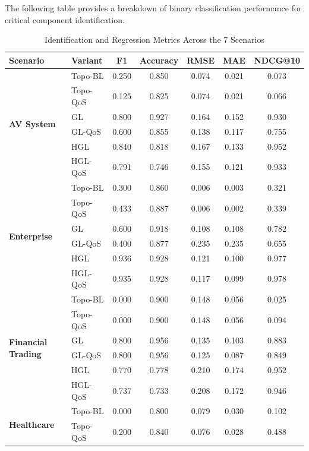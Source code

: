 \documentclass[sigconf,9pt,anonymous]{acmart}
\begin{document}
The following table provides a breakdown of binary classification performance for critical component identification.

\begin{table}[t]
\centering
\caption{Identification and Regression Metrics Across the 7 Scenarios}
\label{tab:ident_perf}
\begin{tabular}{l l c c c c c}
\toprule
\textbf{Scenario} & \textbf{Variant} & \textbf{F1} & \textbf{Accuracy} & \textbf{RMSE} & \textbf{MAE} & \textbf{NDCG@10} \\
\midrule
\multirow{6}{*}{\textbf{AV System}} 
  & Topo-BL & 0.250 & 0.850 & 0.074 & 0.021 & 0.073 \\
  & Topo-QoS & 0.125 & 0.825 & 0.074 & 0.021 & 0.066 \\
  & GL & 0.800 & 0.927 & 0.164 & 0.152 & 0.930 \\
  & GL-QoS & 0.600 & 0.855 & 0.138 & 0.117 & 0.755 \\
  & HGL & 0.840 & 0.818 & 0.167 & 0.133 & 0.952 \\
  & HGL-QoS & 0.791 & 0.746 & 0.155 & 0.121 & 0.933 \\
\midrule
\multirow{6}{*}{\textbf{Enterprise}} 
  & Topo-BL & 0.300 & 0.860 & 0.006 & 0.003 & 0.321 \\
  & Topo-QoS & 0.433 & 0.887 & 0.006 & 0.002 & 0.339 \\
  & GL & 0.600 & 0.918 & 0.108 & 0.108 & 0.782 \\
  & GL-QoS & 0.400 & 0.877 & 0.235 & 0.235 & 0.655 \\
  & HGL & 0.936 & 0.928 & 0.121 & 0.100 & 0.977 \\
  & HGL-QoS & 0.935 & 0.928 & 0.117 & 0.099 & 0.978 \\
\midrule
\multirow{6}{*}{\textbf{Financial Trading}} 
  & Topo-BL & 0.000 & 0.900 & 0.148 & 0.056 & 0.025 \\
  & Topo-QoS & 0.000 & 0.900 & 0.148 & 0.056 & 0.094 \\
  & GL & 0.800 & 0.956 & 0.135 & 0.103 & 0.883 \\
  & GL-QoS & 0.800 & 0.956 & 0.125 & 0.087 & 0.849 \\
  & HGL & 0.770 & 0.778 & 0.210 & 0.174 & 0.952 \\
  & HGL-QoS & 0.737 & 0.733 & 0.208 & 0.172 & 0.946 \\
\midrule
\multirow{6}{*}{\textbf{Healthcare}} 
  & Topo-BL & 0.000 & 0.800 & 0.079 & 0.030 & 0.102 \\
  & Topo-QoS & 0.200 & 0.840 & 0.076 & 0.028 & 0.488 \\

\end{tabular}
\end{table}
\end{document}

